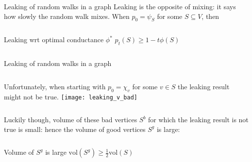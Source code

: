 \documentclass[../main.tex]{subfiles}
\begin{document}
    \begin{frame}{Leaking of random walks in a graph}
        Leaking is the opposite of mixing: it says how slowly the random walk mixes.
        When $p_0= \psi_S$ for some $S\subseteq V$, then
        \begin{columns}
            \begin{block}{Leaking wrt optimal conductance $\phi^*$}
                $p_t(S) \geq 1 - t\phi(S)$
            \end{block}
        \end{columns}
            
            
        \begin{columns}
	    \end{columns}
   \end{frame}
   
   	\begin{frame}{Leaking of random walks in a graph}
   		\begin{columns}
			Unfortunately, when starting with $p_0=\chi_v$ for some $v\in S$ the leaking result might not be true.
			\texttt{[image: leaking\_v\_bad]}
		\end{columns}
		Luckily though, volume of these bad vertices $S^b$ for which the leaking result is not true is small: hence the volume of good vertices $S^g$ is large:
        \begin{columns}
            \begin{block}{Volume of $S^g$ is large}
                $\text{vol}(S^g) \geq \frac{1}{2}\text{vol}(S)$
            \end{block}
        \end{columns}
    \end{frame}
    
\end{document}
